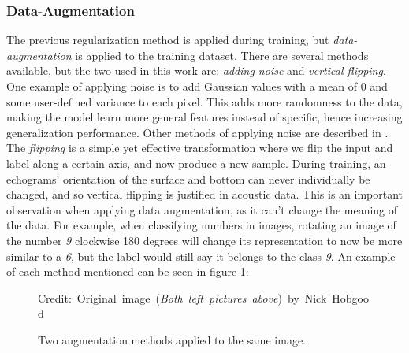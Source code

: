 \subsubsection{Data-Augmentation} \label{data-augmentation}
    The previous regularization method is applied during training, but \textit{data-augmentation} is applied to the training dataset\cite{kukavcka2017_regularization}. There are several methods available, but the two used in this work are: \textit{adding noise} and \textit{vertical flipping}. One example of applying noise is to add Gaussian values with a mean of 0 and some user-defined variance to each pixel. This adds more randomness to the data, making the model learn more general features instead of specific, hence increasing generalization performance. Other methods of applying noise are described in \citeauthor{kukavcka2017_regularization}\cite{kukavcka2017_regularization}. The \textit{flipping} is a simple yet effective transformation where we flip the input and label along a certain axis, and now produce a new sample. During training, an echograms' orientation of the surface and bottom can never individually be changed, and so vertical flipping is justified in acoustic data. This is an important observation when applying data augmentation, as it can't change the meaning of the data. For example, when classifying numbers in images, rotating an image of the number \textit{9} clockwise 180 degrees will change its representation to now be more similar to a \textit{6}, but the label would still say it belongs to the class \textit{9}. An example of each method mentioned can be seen in figure \ref{data augmentation fig}:
    
    \begin{figure}[H]
        \centering
        
        
        
        
        \caption[Two data augmentation examples]{Two augmentation methods applied to the same image.}
        \medskip 
        \hspace*{15pt}\hbox{\scriptsize Credit: Original image (\textit{Both left pictures above}) by Nick Hobgood\cite{clownfish_image}}
        \label{data augmentation fig}
        
        \end{figure}
    
